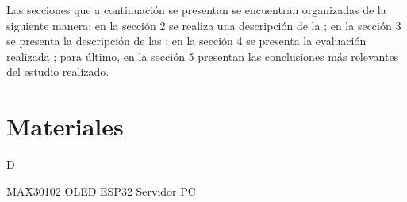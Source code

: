 \documentclass[journal]{IEEEtran}
\begin{document}

Las secciones que a continuación se presentan se encuentran organizadas de la siguiente manera: en la sección 2 se realiza una descripción de la ; en la sección 3 se presenta la descripción de las ; en la sección 4 se presenta la evaluación realizada ; para último, en la sección 5 presentan las conclusiones más relevantes del estudio realizado.









\section{Materiales}

D

MAX30102
OLED
ESP32
Servidor
PC


\end{document}
